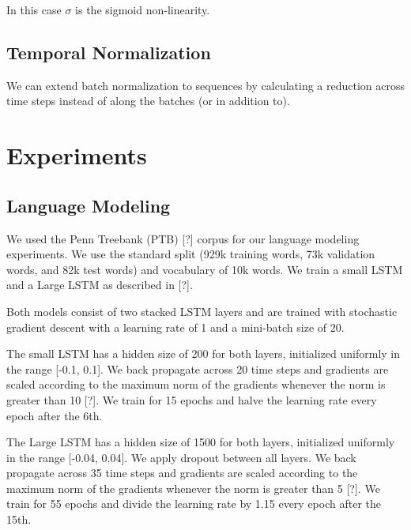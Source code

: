 \documentclass{article}
\begin{document}
In this case $\sigma$ is the sigmoid non-linearity.

\subsection{Temporal Normalization}
We can extend batch normalization to sequences by calculating a reduction across time steps instead of along the batches (or in addition to). 

\section{Experiments}

\subsection{Language Modeling}
We used the Penn Treebank (PTB) [?] corpus for our language modeling experiments. We use the standard split (929k training words, 73k validation words, and 82k test words) and vocabulary of 10k words. We train a small LSTM and a Large LSTM as described in [?].

Both models consist of two stacked LSTM layers and are trained with stochastic gradient descent with a learning rate of 1 and a mini-batch size of 20.

The small LSTM has a hidden size of 200 for both layers, initialized uniformly in the range [-0.1, 0.1]. We back propagate across 20 time steps and gradients are scaled according to the maximum norm of the gradients whenever the norm is greater than 10 [?]. We train for 15 epochs and halve the learning rate every epoch after the 6th.  

The Large LSTM has a hidden size of 1500 for both layers, initialized uniformly in the range [-0.04, 0.04]. We apply dropout between all layers. We back propagate across 35 time steps and gradients are scaled according to the maximum norm of the gradients whenever the norm is greater than 5 [?]. We train for 55 epochs and divide the learning rate by 1.15 every epoch after the 15th.
\end{document}
